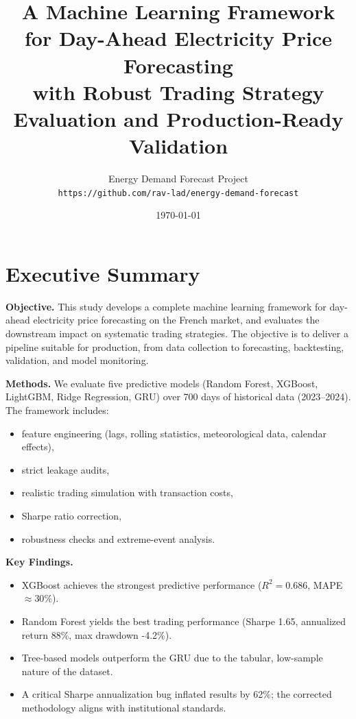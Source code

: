 \documentclass[11pt,a4paper]{article}
\title{\textbf{
A Machine Learning Framework for Day-Ahead Electricity Price Forecasting\\
with Robust Trading Strategy Evaluation and Production-Ready Validation
}}
\author{
    Energy Demand Forecast Project \\
    \texttt{https://github.com/rav-lad/energy-demand-forecast} \\[1em]
}
\date{\today}
\begin{document}
\maketitle

\section*{Executive Summary}

\textbf{Objective.}  
This study develops a complete machine learning framework for day-ahead electricity price forecasting on the French market, and evaluates the downstream impact on systematic trading strategies. The objective is to deliver a pipeline suitable for production, from data collection to forecasting, backtesting, validation, and model monitoring.

\textbf{Methods.}  
We evaluate five predictive models (Random Forest, XGBoost, LightGBM, Ridge Regression, GRU) over 700 days of historical data (2023–2024). The framework includes:
\begin{itemize}
    \item feature engineering (lags, rolling statistics, meteorological data, calendar effects),
    \item strict leakage audits,
    \item realistic trading simulation with transaction costs,
    \item Sharpe ratio correction,
    \item robustness checks and extreme-event analysis.
\end{itemize}

\textbf{Key Findings.}
\begin{itemize}
    \item XGBoost achieves the strongest predictive performance ($R^2 = 0.686$, MAPE $\approx 30\%$).
    \item Random Forest yields the best trading performance (Sharpe 1.65, annualized return 88\%, max drawdown -4.2\%).
    \item Tree-based models outperform the GRU due to the tabular, low-sample nature of the dataset.
    \item A critical Sharpe annualization bug inflated results by 62\%; the corrected methodology aligns with institutional standards.
\end{itemize}
\end{document}
